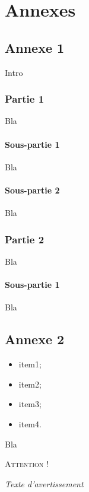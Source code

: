 \part*{Annexes}


\chapter*{Annexe 1}

\makeatletter
\renewcommand{\thesection}{\@arabic\c@section}
\makeatother

\setcounter{section}{0}
Intro
\section{Partie 1}
Bla
\subsection{Sous-partie 1}
Bla
\subsection{Sous-partie 2}
Bla
\section{Partie 2}
Bla
\subsection{Sous-partie 1}
Bla

\chapter*{Annexe 2}

\setcounter{section}{0}
\begin{itemize}
\item item1;
\item item2;
\item item3;
\item item4.
\end{itemize}

Bla

\begin{center}
\textsc{Attention !}

\textit{Texte d'avertissement}
\end{center}

